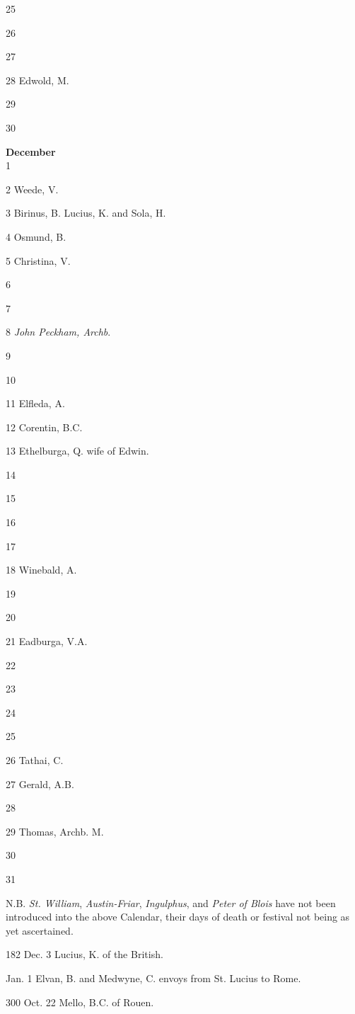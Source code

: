 25

26

27

28 Edwold, M.

29

30

\textbf{December}\\
1

2 Weede, V.

3 Birinus, B. Lucius, K.
and Sola, H.

4 Osmund, B.

5 Christina, V.

6

7

8 \emph{John Peckham, Archb}.

9

10

11 Elfleda, A.

12 Corentin, B.C.

13 Ethelburga, Q. wife of Edwin.

14

15

16

17

18 Winebald, A.

19

20

21 Eadburga, V.A.

22

23

24

25

26 Tathai, C.

27 Gerald, A.B.

28

29 Thomas, Archb. M.

30

31

N.B. \emph{St. William}, \emph{Austin-Friar}, \emph{Ingulphus},
and \emph{Peter of Blois} have not been introduced into the above
Calendar, their days of death or festival not being as yet ascertained.



182 Dec.
3
Lucius, K. of the British.

Jan. 1
Elvan, B. and Medwyne, C. envoys from St. Lucius to Rome.


300 Oct.
22
Mello,
B.C. of Rouen.

